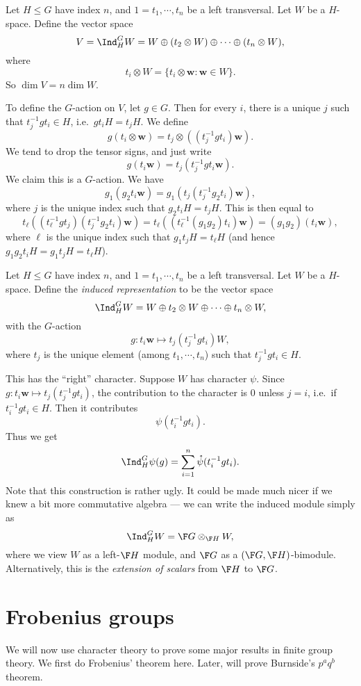 \documentclass[a4paper]{article}
\begin{document}
Let $H \leq G$ have index $n$, and $1 = t_1, \cdots, t_n$ be a left transversal. Let $W$ be a $H$-space. Define the vector space
\[
  V = \Ind_H^G W = W \oplus (t_2 \otimes W) \oplus \cdots \oplus (t_n \otimes W),
\]
where
\[
  t_i \otimes W = \{t_i \otimes \mathbf{w}: \mathbf{w} \in W\}.
\]
So $\dim V = n \dim W$.

To define the $G$-action on $V$, let $g \in G$. Then for every $i$, there is a unique $j$ such that $t_j^{-1} g t_i \in H$, i.e.\ $gt_iH = t_j H$. We define
\[
  g(t_i \otimes \mathbf{w}) = t_j \otimes ((t_j^{-1}gt_i) \mathbf{w}).
\]
We tend to drop the tensor signs, and just write
\[
  g(t_i \mathbf{w}) = t_j (t_j^{-1} g t_i \mathbf{w}).
\]
We claim this is a $G$-action. We have
\[
  g_1(g_2 t_i \mathbf{w}) = g_1(t_j(t_j^{-1} g_2 t_i)\mathbf{w}),
\]
where $j$ is the unique index such that $g_2 t_i H = t_j H$. This is then equal to
\[
  t_\ell ((t_\ell^{-1} g t_j)(t_j^{-1} g_2 t_i) \mathbf{w}) = t_\ell((t_\ell^{-1}(g_1g_2)t_i) \mathbf{w}) = (g_1g_2)(t_i \mathbf{w}),
\]
where $\ell$ is the unique index such that $g_1 t_j H = t_\ell H$ (and hence $g_1 g_2 t_i H = g_1 t_j H = t_\ell H$).

\begin{defi}
  Let $H \leq G$ have index $n$, and $1 = t_1, \cdots, t_n$ be a left transversal. Let $W$ be a $H$-space. Define the \emph{induced representation} to be the vector space
  \[
    \Ind_H^G W = W \oplus t_2 \otimes W \oplus \cdots \oplus t_n \otimes W,
  \]
  with the $G$-action
  \[
    g: t_i \mathbf{w} \mapsto t_j (t_j^{-1} g t_i)W,
  \]
  where $t_j$ is the unique element (among $t_1, \cdots, t_n$) such that $t_j^{-1} gt_i \in H$.
\end{defi}

This has the ``right'' character. Suppose $W$ has character $\psi$. Since $g: t_i \mathbf{w} \mapsto t_j (t_j^{-1} gt_i)$, the contribution to the character is $0$ unless $j = i$, i.e.\ if $t_i^{-1} g t_i \in H$. Then it contributes
\[
  \psi (t_i^{-1} g t_i).
\]
Thus we get
\[
  \Ind_H^G \psi(g) = \sum_{i = 1}^n \mathring{\psi}(t_i^{-1} g t_i).
\]
Note that this construction is rather ugly. It could be made much nicer if we knew a bit more commutative algebra --- we can write the induced module simply as
\[
  \Ind_H^G W = \F G \otimes_{\F H} W,
\]
where we view $W$ as a left-$\F H$ module, and $\F G$ as a $(\F G, \F H)$-bimodule. Alternatively, this is the \emph{extension of scalars} from $\F H$ to $\F G$.

\section{Frobenius groups}
We will now use character theory to prove some major results in finite group theory. We first do Frobenius' theorem here. Later, will prove Burnside's $p^a q^b$ theorem.
\end{document}
